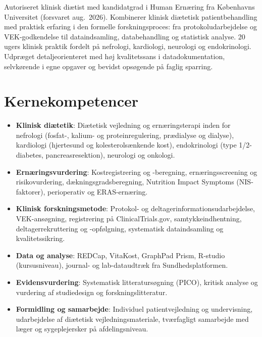 \documentclass[11pt,a4paper,sans]{moderncv}
\begin{document}
\makecvtitle


\vspace{6pt}
\small{Autoriseret klinisk diætist med kandidatgrad i Human Ernæring fra Københavns Universitet (forsvaret aug.\ 2026). Kombinerer klinisk diætetisk patientbehandling med praktisk erfaring i den formelle forskningsproces: fra protokoludarbejdelse og VEK-godkendelse til dataindsamling, databehandling og statistisk analyse. 20 ugers klinisk praktik fordelt på nefrologi, kardiologi, neurologi og endokrinologi. Udpræget detaljeorienteret med høj kvalitetssans i datadokumentation, selvkørende i egne opgaver og bevidst opsøgende på faglig sparring.}


\section{Kernekompetencer}
\vspace{1pt}
\begin{itemize}

\item \textbf{Klinisk diætetik}: Diætetisk vejledning og ernæringsterapi inden for nefrologi (fosfat-, kalium- og proteinregulering, prædialyse og dialyse), kardiologi (hjertesund og kolesterolsænkende kost), endokrinologi (type 1/2-diabetes, pancreasresektion), neurologi og onkologi.

\item \textbf{Ernæringsvurdering}: Kostregistrering og -beregning, ernæringsscreening og risikovurdering, dækningsgradsberegning, Nutrition Impact Symptoms (NIS-faktorer), perioperativ og ERAS-ernæring.

\item \textbf{Klinisk forskningsmetode}: Protokol- og deltagerinformationsudarbejdelse, VEK-ansøgning, registrering på ClinicalTrials.gov, samtykkeindhentning, deltagerrekruttering og -opfølgning, systematisk dataindsamling og kvalitetssikring.

\item \textbf{Data og analyse}: REDCap, VitaKost, GraphPad Prism, R-studio (kursusniveau), journal- og lab-dataudtræk fra Sundhedsplatformen.

\item \textbf{Evidensvurdering}: Systematisk litteratursøgning (PICO), kritisk analyse og vurdering af studiedesign og forskningslitteratur.

\item \textbf{Formidling og samarbejde}: Individuel patientvejledning og undervisning, udarbejdelse af diætetisk vejledningsmateriale, tværfagligt samarbejde med læger og sygeplejersker på afdelingsniveau.

\end{itemize}
\end{document}
